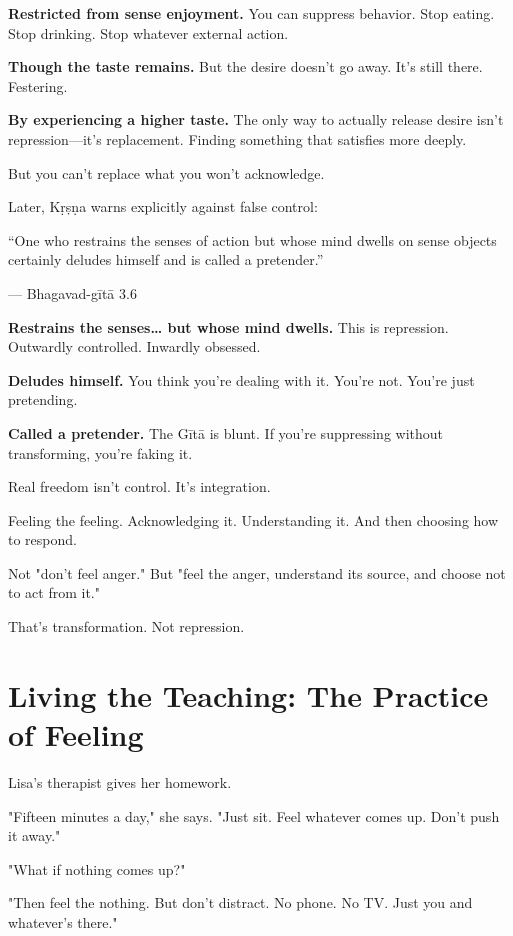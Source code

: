 \documentclass[11pt,twoside]{book}
\begin{document}
\textbf{\textbf{Restricted from sense enjoyment.}} You can suppress behavior. Stop eating. Stop drinking. Stop whatever external action.

\textbf{\textbf{Though the taste remains.}} But the desire doesn't go away. It's still there. Festering.

\textbf{\textbf{By experiencing a higher taste.}} The only way to actually release desire isn't repression—it's replacement. Finding something that satisfies more deeply.

But you can't replace what you won't acknowledge.

Later, Kṛṣṇa warns explicitly against false control:

\begin{pullquote}
``One who restrains the senses of action but whose mind dwells on sense objects certainly deludes himself and is called a pretender.''

--- Bhagavad-gītā 3.6
\end{pullquote}

\textbf{\textbf{Restrains the senses\ldots{} but whose mind dwells.}} This is repression. Outwardly controlled. Inwardly obsessed.

\textbf{\textbf{Deludes himself.}} You think you're dealing with it. You're not. You're just pretending.

\textbf{\textbf{Called a pretender.}} The Gītā is blunt. If you're suppressing without transforming, you're faking it.

Real freedom isn't control. It's integration.

Feeling the feeling. Acknowledging it. Understanding it. And then choosing how to respond.

Not "don't feel anger." But "feel the anger, understand its source, and choose not to act from it."

That's transformation. Not repression.

\section*{Living the Teaching: The Practice of Feeling}

Lisa's therapist gives her homework.

"Fifteen minutes a day," she says. "Just sit. Feel whatever comes up. Don't push it away."

"What if nothing comes up?"

"Then feel the nothing. But don't distract. No phone. No TV. Just you and whatever's there."
\end{document}
